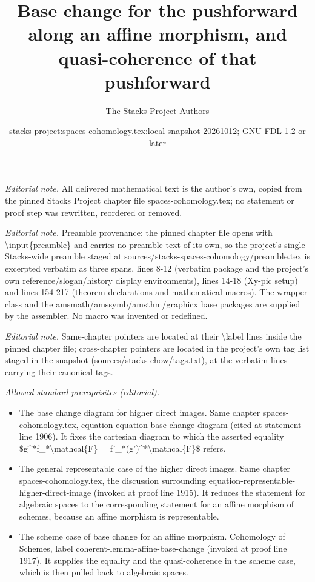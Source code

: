 \documentclass[10pt,a4paper]{amsart}
\title{Base change for the pushforward along an affine morphism, and quasi-coherence of that pushforward}
\author{The Stacks Project Authors}
\date{stacks-project:spaces-cohomology.tex:local-snapshot-20261012; GNU FDL 1.2 or later}
\theoremstyle{plain}
\theoremstyle{definition}
\theoremstyle{remark}
\numberwithin{equation}{subsection}
\begin{document}
\maketitle
\noindent\textit{Editorial note.} All delivered mathematical text is the author's own, copied from the pinned Stacks Project chapter file spaces-cohomology.tex; no statement or proof step was rewritten, reordered or removed.\par\medskip
\noindent\textit{Editorial note.} Preamble provenance: the pinned chapter file opens with \textbackslash{}input\{preamble\} and carries no preamble text of its own, so the project's single Stacks-wide preamble staged at sources/stacks-spaces-cohomology/preamble.tex is excerpted verbatim as three spans, lines 8-12 (verbatim package and the project's own reference/slogan/history display environments), lines 14-18 (Xy-pic setup) and lines 154-217 (theorem declarations and mathematical macros). The wrapper class and the amsmath/amssymb/amsthm/graphicx base packages are supplied by the assembler. No macro was invented or redefined.\par\medskip
\noindent\textit{Editorial note.} Same-chapter pointers are located at their \textbackslash{}label lines inside the pinned chapter file; cross-chapter pointers are located in the project's own tag list staged in the snapshot (sources/stacks-chow/tags.txt), at the verbatim lines carrying their canonical tags.\par\medskip
\noindent\textit{Allowed standard prerequisites (editorial).}\begin{itemize}
\item The base change diagram for higher direct images. Same chapter spaces-cohomology.tex, equation equation-base-change-diagram (cited at statement line 1906). It fixes the cartesian diagram to which the asserted equality \$g\textasciicircum{}*f\_*\textbackslash{}mathcal\{F\} = f'\_*(g')\textasciicircum{}*\textbackslash{}mathcal\{F\}\$ refers.
\item The general representable case of the higher direct images. Same chapter spaces-cohomology.tex, the discussion surrounding equation-representable-higher-direct-image (invoked at proof line 1915). It reduces the statement for algebraic spaces to the corresponding statement for an affine morphism of schemes, because an affine morphism is representable.
\item The scheme case of base change for an affine morphism. Cohomology of Schemes, label coherent-lemma-affine-base-change (invoked at proof line 1917). It supplies the equality and the quasi-coherence in the scheme case, which is then pulled back to algebraic spaces.
\end{itemize}\medskip
\end{document}
